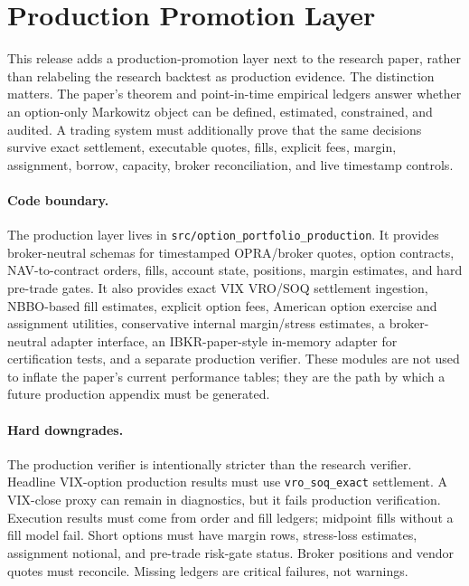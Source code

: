 \section{Production Promotion Layer}

This release adds a production-promotion layer next to the research paper, rather than
relabeling the research backtest as production evidence.  The distinction matters.  The
paper's theorem and point-in-time empirical ledgers answer whether an option-only
Markowitz object can be defined, estimated, constrained, and audited.  A trading system
must additionally prove that the same decisions survive exact settlement, executable
quotes, fills, explicit fees, margin, assignment, borrow, capacity, broker reconciliation,
and live timestamp controls.

\paragraph{Code boundary.}
The production layer lives in \texttt{src/option\_portfolio\_production}.  It provides
broker-neutral schemas for timestamped OPRA/broker quotes, option contracts, NAV-to-contract
orders, fills, account state, positions, margin estimates, and hard pre-trade gates.  It
also provides exact VIX VRO/SOQ settlement ingestion, NBBO-based fill estimates, explicit
option fees, American option exercise and assignment utilities, conservative internal
margin/stress estimates, a broker-neutral adapter interface, an IBKR-paper-style in-memory
adapter for certification tests, and a separate production verifier.  These modules are
not used to inflate the paper's current performance tables; they are the path by which a
future production appendix must be generated.

\paragraph{Hard downgrades.}
The production verifier is intentionally stricter than the research verifier.  Headline
VIX-option production results must use \texttt{vro\_soq\_exact} settlement.  A VIX-close
proxy can remain in diagnostics, but it fails production verification.  Execution results
must come from order and fill ledgers; midpoint fills without a fill model fail.  Short
options must have margin rows, stress-loss estimates, assignment notional, and pre-trade
risk-gate status.  Broker positions and vendor quotes must reconcile.  Missing ledgers are
critical failures, not warnings.

